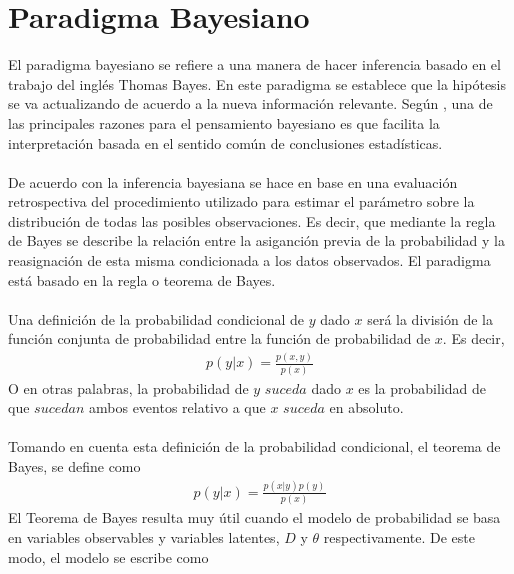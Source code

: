 \section{Paradigma Bayesiano}
El paradigma bayesiano se refiere a una manera de hacer inferencia basado en el trabajo del ingl\'es Thomas Bayes. En este paradigma se establece que la hip\'otesis se va actualizando de acuerdo a la nueva informaci\'on  relevante. Seg\'un \cite{gelman2014bayesian}, una de las principales razones para el pensamiento bayesiano es que facilita la interpretaci\'on basada en el sentido com\'un de conclusiones estad\'isticas. \\
\\
De acuerdo con \cite{gelman2014bayesian} la inferencia bayesiana se hace en base en una evaluaci\'on retrospectiva del procedimiento utilizado para estimar el par\'ametro sobre la distribuci\'on de todas las posibles observaciones. Es decir, que mediante la regla de Bayes se describe la relaci\'on entre la asiganci\'on previa de la probabilidad y la reasignaci\'on de esta misma condicionada a los datos observados. El paradigma est\'a basado en la regla o teorema de Bayes.\\
\\
Una definici\'on de la probabilidad condicional de $y$ dado $x$  ser\'a la divisi\'on de la funci\'on conjunta de probabilidad entre la funci\'on de probabilidad de $x$. Es decir,
\begin{align*}
p(y|x)=\frac{p(x,y)}{p(x)}
\end{align*}
O en otras palabras, la probabilidad de $y$ $suceda$ dado $x$ es la probabilidad de que $sucedan$ ambos eventos relativo a que $x$ $suceda$ en absoluto.\\
\\
Tomando en cuenta esta definici\'on de la probabilidad condicional, el teorema de Bayes, se define como
\begin{align*}
p(y|x)=\frac{p(x|y)p(y)}{p(x)}
\end{align*}
El Teorema de Bayes resulta muy \'util cuando el modelo de probabilidad se basa en variables observables y  variables latentes, $D$ y $\theta$ respectivamente. De este modo, el modelo se escribe como
